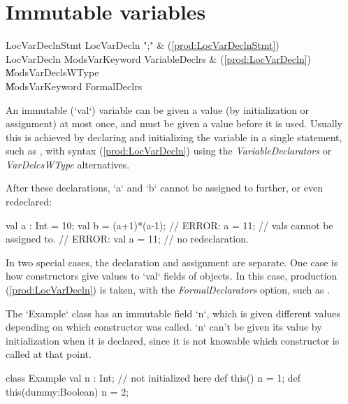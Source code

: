 \section{Immutable variables}
\label{FinalVariables}

\begin{bbgrammar}
     LocVarDeclnStmt \: LocVarDecln \xcd";" & (\ref{prod:LocVarDeclnStmt}) \\
         LocVarDecln \: Mods\opt VarKeyword VariableDeclrs & (\ref{prod:LocVarDecln}) \\
                     \| Mods\opt VarDeclsWType \\
                     \| Mods\opt VarKeyword FormalDeclrs \\
\end{bbgrammar}

An immutable (\xcd`val`) variable can be given a value (by initialization or
assignment) at 
most once, and must be given a value before it is used.  Usually this is
achieved by declaring and initializing the variable in a single statement, 
such as , with syntax 
(\ref{prod:LocVarDecln}) using the {\it VariableDeclarators} or {\it
VarDelcsWType} alternatives.

\begin{ex}
After these declarations, \xcd`a` and \xcd`b` cannot be assigned to further,
or even redeclared:  
\begin{xten}
val a : Int = 10;
val b = (a+1)*(a-1);
// ERROR: a = 11;  // vals cannot be assigned to.
// ERROR: val a = 11; // no redeclaration.
\end{xten}

\end{ex}

In two special cases, the declaration and assignment are separate.  One 
case is how constructors give values to \xcd`val` fields of objects.  In this
case, production (\ref{prod:LocVarDecln}) is taken, with the {\it
FormalDeclarators} option, such as  .  

\begin{ex} The
\xcd`Example` class has an immutable field \xcd`n`, which is given different
values depending on which constructor was called. \xcd`n` can't be given its
value by initialization when it is declared, since it is not knowable which
constructor is called at that point.  
\begin{xten}
class Example {
  val n : Int; // not initialized here
  def this() { n = 1; }
  def this(dummy:Boolean) { n = 2;}
}
\end{xten}
%
\end{ex}


